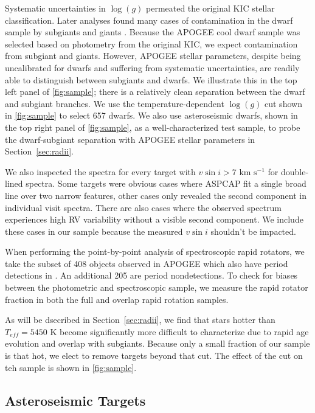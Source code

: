\documentclass[manuscript]{aastex6}
\newcommand{\vsini}{\ensuremath{v \sin i}}
\newcommand{\Teff}{\ensuremath{T_{eff}}}
\newcommand{\logg}{\ensuremath{\log(g)}}
\newcommand{\kms}{\textrm{ km~s}\ensuremath{^{-1}}}
\begin{document}
Systematic uncertainties in \logg{} permeated the original KIC stellar
classification. Later analyses found many cases of contamination in the dwarf 
sample by subgiants 
and giants \citep{Mann12,Gaidos13}. Because the APOGEE cool dwarf sample was 
selected based on photometry from the original KIC, we expect contamination 
from subgiant and giants. However, APOGEE stellar parameters, 
despite being uncalibrated for dwarfs and suffering from 
systematic uncertainties, are readily able to distinguish between subgiants and 
dwarfs. We illustrate this in the top left panel of \cref{fig:sample}; there is a 
relatively clean separation between the dwarf and subgiant branches. We use the
temperature-dependent \logg{} cut shown in \cref{fig:sample} to select 657
dwarfs. We also use asteroseismic dwarfs, shown in the top right panel of
\cref{fig:sample}, as a well-characterized test sample, to probe the 
dwarf-subgiant separation with APOGEE stellar parameters in
Section~\ref{sec:radii}.

We also inspected the spectra for every target with \(\vsini > 7 \kms\)
for double-lined spectra. Some targets were obvious cases where ASPCAP fit a 
single broad line over two narrow features, other cases only revealed the
second component in individual visit spectra. There are
also cases where the observed spectrum experiences high RV variability
without a visible second component. We include these cases in our sample
because the measured \vsini{} shouldn't be impacted.

When performing the point-by-point analysis of spectroscopic rapid rotators, 
we take the subset of 408 objects
observed in APOGEE which also have period detections in \citet{McQuillan14}.
An additional 205 are period nondetections. To check for biases between the
photometric and spectroscopic sample, we measure the rapid rotator fraction in
both the full and overlap rapid rotation samples.

As will be dsecribed in Section~\ref{sec:radii}, we find that stars hotter than
\(\Teff = 5450\) K become significantly more difficult to characterize due to
rapid age evolution and overlap with subgiants. Because only a small fraction
of our sample is that hot, we elect to remove targets beyond that cut. The
effect of the cut on teh sample is shown in \cref{fig:sample}.

\subsection{Asteroseismic Targets}
\end{document}
